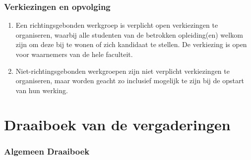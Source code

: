 \section{Verkiezingen en opvolging}
\begin{enumerate}
    \item Een richtingsgebonden werkgroep is verplicht open verkiezingen te organiseren, waarbij alle studenten van de betrokken opleiding(en) welkom zijn om deze bij te wonen of zich kandidaat te stellen. De verkiezing is open voor waarnemers van de hele faculteit.
    \item Niet-richtingsgebonden werkgroepen zijn niet verplicht verkiezingen te organiseren, maar worden geacht zo inclusief mogelijk te zijn bij de opstart van hun werking.
\end{enumerate}

\part{Draaiboek van de vergaderingen}
\section{Algemeen Draaiboek}\label{sec:AlgemeenDraaiboek}


